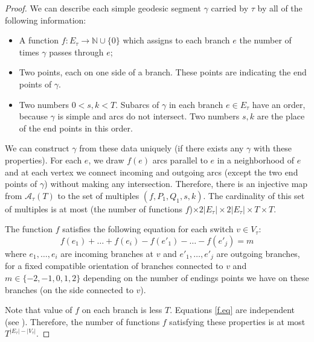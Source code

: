 \documentclass[11pt]{article} %
\theoremstyle{plain}
\theoremstyle{definition}
\numberwithin{equation}{section}
\begin{document}
\begin{proof}
\iffalse
Define $B_{\tau}(T)$ and $A_{\tau}(T)$ in the following way:

\begin{itemize}[topsep=0mm, itemsep=0mm]
\item $B_{\tau}(T)$ is the total number of words of length less than $T$ with alphabet from $B^{\tau}$ which are corresponding to a ray carried by $\tau$. 
\item $A_{\tau}(T)$ is the number of the same set of words with additional property of being admissible.
\end{itemize}

We can see $B_{\tau}$ increases exponentially. On the other hand, we now show that $A_{\tau}(T) < 4n^2T^2\binom{T+n-1}{n-1}$ which is a polynomial in $T$, of degree $n+1$ via the following argument.\\
\fi
We can describe each simple geodesic segment $\gamma$ carried by $\tau$ by all of the following information:
\begin{itemize}[topsep=0mm, itemsep=0mm]
    \item A function $f: E_{\tau} \to \mathbb{N}\cup\{0\}$ which assigns to each branch $e$ the number of times $\gamma$ passes through $e$;
    \item Two points, each on one side of a branch. These points are indicating the end points of $\gamma$.
    \item Two numbers $0<s,k<T$. Subarcs of $\gamma$ in each branch $e \in E_\tau$ have an order,  because $\gamma$ is simple and arcs do not intersect. Two numbers $s,k$ are the place of the end points in this order.
\end{itemize}   
We can construct $\gamma$ from these data uniquely (if there exists any $\gamma$ with these properties).  For each $e$, we draw $f(e)$ arcs parallel to $e$ in a neighborhood of $e$ and at each vertex we  connect incoming and outgoing arcs (except the two end points of $\gamma$) without making any intersection. Therefore, there is an injective map from $\mathcal{A}_{\tau}(T)$ to the set of multiples $(f, P_1,Q_1,s,k)$. The cardinality of this set of multiples is at most (the number of functions $f$)$\times 2|E_\tau|\times 2|E_\tau| \times T \times T$. 

The function $f$ satisfies the following equation for each switch $v\in V_\tau$:
\begin{equation}\label{f.eq}
f(e_1)+\dots+f(e_i)-f(e'_1)-\dots-f(e'_j)=m
\end{equation}
where $e_1,\dots,e_i$ are incoming branches at $v$ and $e'_1, \dots, e'_j$ are outgoing branches, for a fixed compatible orientation of branches connected to $v$ and $m \in \{ -2,-1,0,1,2 \}$ depending on the number of endings points we have on these branches (on the side connected to $v$).

Note that value of $f$ on each branch is less $T$. Equations \ref{f.eq} are independent (see \cite[Lamma 2.1.1]{com.tr}). Therefore, the number of functions $f$ satisfying these properties is at most $T^{|E_{\tau}|-|V_{\tau}|}$.
\end{proof}
\end{document}
